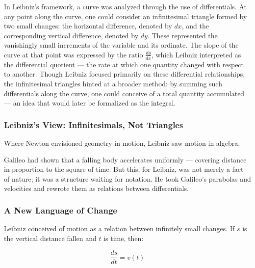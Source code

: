 In Leibniz’s framework, a curve was analyzed through the use of differentials. At any point along the curve, one could consider an infinitesimal triangle formed by two small changes: the horizontal difference, denoted by $dx$, and the corresponding vertical difference, denoted by $dy$. These represented the vanishingly small increments of the variable and its ordinate. The slope of the curve at that point was expressed by the ratio $\frac{dy}{dx}$, which Leibniz interpreted as the differential quotient — the rate at which one quantity changed with respect to another. Though Leibniz focused primarily on these differential relationships, the infinitesimal triangles hinted at a broader method: by summing such differentials along the curve, one could conceive of a total quantity accumulated — an idea that would later be formalized as the integral.

\subsubsection{Leibniz’s View: Infinitesimals, Not Triangles}

Where Newton envisioned geometry in motion, Leibniz saw motion in algebra.

Galileo had shown that a falling body accelerates uniformly — covering distance in proportion to the square of time. But this, for Leibniz, was not merely a fact of nature; it was a structure waiting for notation. He took Galileo’s parabolas and velocities and rewrote them as relations between differentials.


\subsubsection{A New Language of Change} 

Leibniz conceived of motion as a relation between infinitely small changes. If $s$ is the vertical distance fallen and $t$ is time, then:

\[
\frac{ds}{dt} = v(t)
\]

